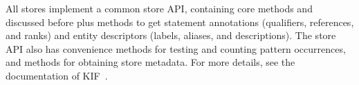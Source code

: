 All stores implement a common store API, containing core methods  and  discussed before plus methods to get statement annotations (qualifiers, references, and ranks) and entity descriptors (labels, aliases, and descriptions).
The store API also has convenience methods for testing and counting pattern occurrences, and methods for obtaining store metadata.
For more details, see the documentation of KIF~\cite{KIF}\@.





